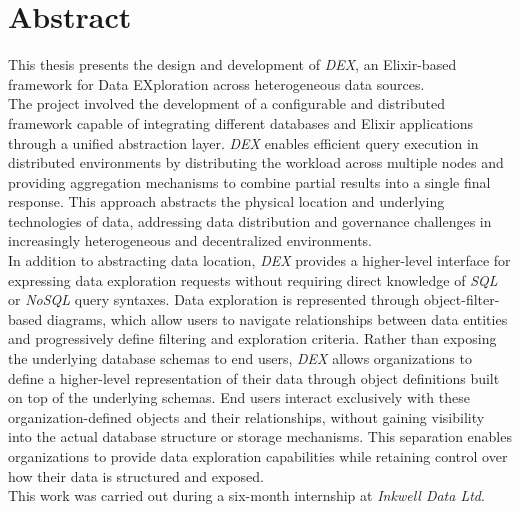\cleardoublepage{}
\blankpage{}
\begingroup
\let\clearpage\relax
\let\cleardoublepage\relax
\chapter*{Abstract}

This thesis presents  the design and development of \textit{DEX}, an
Elixir-based framework for Data EXploration across heterogeneous data sources.\\ 

The project involved the development of a configurable and distributed framework
capable of integrating different databases and Elixir applications through a
unified abstraction layer. \textit{DEX} enables efficient query execution in
distributed environments by distributing the workload across multiple nodes and
providing aggregation mechanisms to combine partial results into a single final
response. This approach abstracts the physical location and underlying
technologies of data, addressing data distribution and governance challenges in
increasingly heterogeneous and decentralized environments.\\

In addition to abstracting data location, \textit{DEX} provides a higher-level
interface for expressing data exploration requests without requiring direct
knowledge of \textit{SQL} or \textit{NoSQL} query syntaxes. Data exploration is
represented through object-filter-based diagrams, which allow users to navigate
relationships between data entities and progressively define filtering and
exploration criteria. Rather than exposing the underlying database schemas to
end users, \textit{DEX} allows organizations to define a higher-level
representation of their data through object definitions built on top of the
underlying schemas. End users interact exclusively with these
organization-defined objects and their relationships, without gaining visibility
into the actual database structure or storage mechanisms. This separation
enables organizations to provide data exploration capabilities while retaining
control over how their data is structured and exposed.\\

This work was carried out during a six-month internship at \textit{Inkwell Data Ltd}.

\endgroup
\vfill
